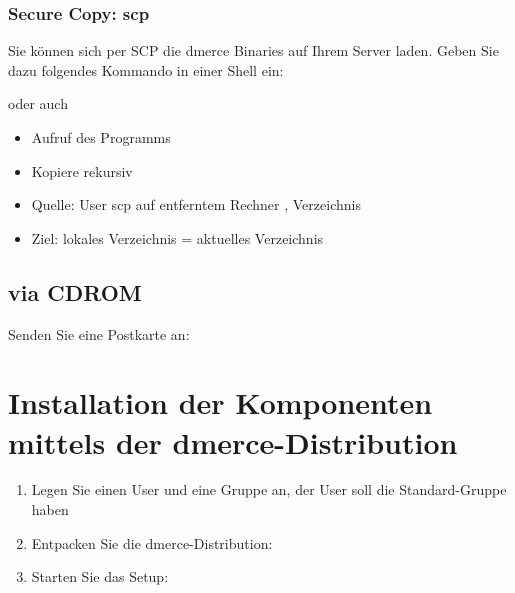 \subsubsection{Secure Copy: scp}

Sie k\"onnen sich per SCP die dmerce Binaries auf Ihrem Server laden.
Geben Sie dazu folgendes Kommando in einer Shell ein:


oder auch\\


\begin{itemize}
\item {} Aufruf des Programms 
\item {} Kopiere rekursiv
\item {} Quelle: User scp auf
  entferntem Rechner , Verzeichnis
\item {} Ziel: lokales Verzeichnis  = aktuelles
  Verzeichnis
\end{itemize}

\subsection{via CDROM}

Senden Sie eine Postkarte an:

\section{Installation der Komponenten mittels der dmerce-Distribution}
\label{InstallationKomponenten}

\begin{enumerate}
\item Legen Sie einen User  und eine Gruppe 
  an, der User  soll die Standard-Gruppe 
  haben
\item Entpacken Sie die dmerce-Distribution:\\
\item Starten Sie das Setup:\\
\end{enumerate}

